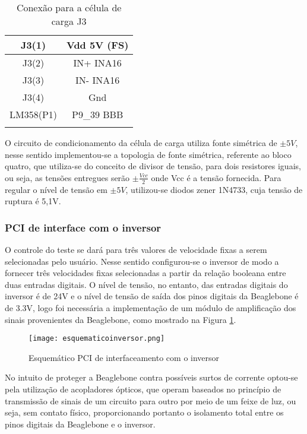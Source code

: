 	\begin{table}[!h]
	\centering
	\caption{Conexão para a célula de carga J3}
	\vspace{0.5cm}
	\begin{tabular}{c c}
	\hline
	J3(1)		&	Vdd 5V (FS)\\
	\hline
	J3(2)		&	IN+ INA16\\
	\hline
	J3(3)		&	IN- INA16\\
	\hline
	J3(4)		&	Gnd\\
	\hline
	LM358(P1)	&	P9\_39 BBB\\
	\hline
	\label{conexaoforca}
	\end{tabular}
	\end{table}


	O circuito de condicionamento da célula de carga utiliza fonte simétrica de $ \pm 5V $, nesse sentido implementou-se a topologia de fonte simétrica, referente ao bloco quatro, que utiliza-se do conceito de divisor de tensão, para dois resistores iguais, ou seja, as tensões entregues serão $\pm \frac{Vcc}{2}$ onde Vcc é a tensão fornecida. Para regular o nível de tensão em $\pm 5V$, utilizou-se diodos zener 1N4733, cuja tensão de ruptura é 5,1V.



	\subsubsection{PCI de interface com o inversor}

	O controle do teste se dará para três valores de velocidade fixas a serem selecionadas pelo usuário. Nesse sentido configurou-se o inversor de modo a fornecer três velocidades fixas selecionadas a partir da relação booleana entre duas entradas digitais. O nível de tensão, no entanto, das entradas digitais do inversor é de 24V e o nível de tensão de saída dos pinos digitais da Beaglebone é de 3.3V, logo foi necessária a implementação de um módulo de amplificação dos sinais provenientes da Beaglebone, como mostrado na Figura \ref{esquemáticoinversor}. 

	\begin{figure}[!h]
		\centering
		\texttt{[image: esquematicoinversor.png]}
		\caption{Esquemático PCI de interfaceamento com o inversor}
		\label{esquemáticoinversor}
	\end{figure}

	No intuito de proteger a Beaglebone contra possíveis surtos de corrente optou-se pela utilização de acopladores ópticos, que operam baseados no princípio de transmissão de sinais de um circuito para outro por meio de um feixe de luz, ou seja, sem contato físico, proporcionando portanto o isolamento total entre os pinos digitais da Beaglebone e o inversor.

